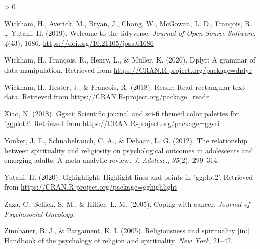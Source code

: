 \documentclass[
  english,
  man,floatsintext]{apa6}
\newlength{\cslhangindent}
\newenvironment{CSLReferences}[2] %
 {%
  \setlength{\parindent}{0pt}
  \ifodd #1 \everypar{\setlength{\hangindent}{\cslhangindent}}\ignorespaces\fi
  \ifnum #2 > 0
  \setlength{\parskip}{#2\baselineskip}
  \fi
 }%
 {}
\begin{document}
\begin{CSLReferences}{1}{0}
\leavevmode\hypertarget{ref-R-tidyverse}{}%
Wickham, H., Averick, M., Bryan, J., Chang, W., McGowan, L. D., François, R., \ldots{} Yutani, H. (2019). Welcome to the {tidyverse}. \emph{Journal of Open Source Software}, \emph{4}(43), 1686. \url{https://doi.org/10.21105/joss.01686}

\leavevmode\hypertarget{ref-R-dplyr}{}%
Wickham, H., François, R., Henry, L., \& Müller, K. (2020). Dplyr: A grammar of data manipulation. Retrieved from \url{https://CRAN.R-project.org/package=dplyr}

\leavevmode\hypertarget{ref-R-readr}{}%
Wickham, H., Hester, J., \& Francois, R. (2018). Readr: Read rectangular text data. Retrieved from \url{https://CRAN.R-project.org/package=readr}

\leavevmode\hypertarget{ref-R-ggsci}{}%
Xiao, N. (2018). Ggsci: Scientific journal and sci-fi themed color palettes for 'ggplot2'. Retrieved from \url{https://CRAN.R-project.org/package=ggsci}

\leavevmode\hypertarget{ref-Yonker2012-zg}{}%
Yonker, J. E., Schnabelrauch, C. A., \& Dehaan, L. G. (2012). The relationship between spirituality and religiosity on psychological outcomes in adolescents and emerging adults: A meta-analytic review. \emph{J. Adolesc.}, \emph{35}(2), 299--314.

\leavevmode\hypertarget{ref-R-gghighlight}{}%
Yutani, H. (2020). Gghighlight: Highlight lines and points in 'ggplot2'. Retrieved from \url{https://CRAN.R-project.org/package=gghighlight}

\leavevmode\hypertarget{ref-Zaza2005-ac}{}%
Zaza, C., Sellick, S. M., \& Hillier, L. M. (2005). Coping with cancer. \emph{Journal of Psychosocial Oncology}.

\leavevmode\hypertarget{ref-Zinnbauer2005-vz}{}%
Zinnbauer, B. J., \& Pargament, K. I. (2005). Religiousness and spirituality {[}in:{]} Handbook of the psychology of religion and spirituality. \emph{New York}, 21--42.

\end{CSLReferences}

\endgroup
\end{document}
